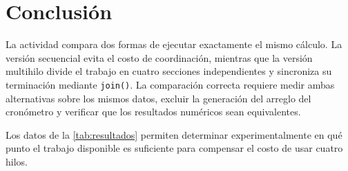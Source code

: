 \documentclass[12pt,oneside]{template/liverpoolthesis}
\begin{document}
\section{Conclusión}

La actividad compara dos formas de ejecutar exactamente el mismo cálculo. La
versión secuencial evita el costo de coordinación, mientras que la versión
multihilo divide el trabajo en cuatro secciones independientes y sincroniza su
terminación mediante \texttt{join()}. La comparación correcta requiere medir
ambas alternativas sobre los mismos datos, excluir la generación del arreglo
del cronómetro y verificar que los resultados numéricos sean equivalentes.

Los datos de la \autoref{tab:resultados} permiten determinar experimentalmente
en qué punto el trabajo disponible es suficiente para compensar el costo de
usar cuatro hilos.

\cleardoublepage
{}
{}
\nocite{*}

\end{document}
